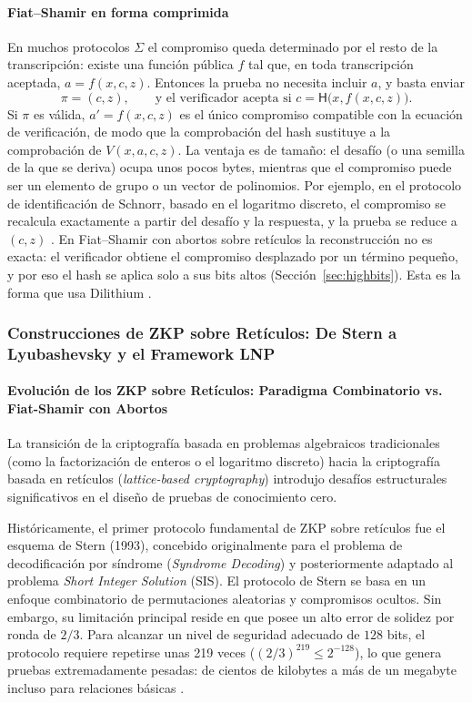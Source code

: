 \paragraph{Fiat--Shamir en forma comprimida}
\label{sec:fs-comprimido}
En muchos protocolos $\Sigma$ el compromiso queda determinado por el resto de la transcripción: existe una función pública $f$ tal que, en toda transcripción aceptada, $a = f(x, c, z)$. Entonces la prueba no necesita incluir $a$, y basta enviar
\begin{equation}
\pi = (c, z), \qquad \text{y el verificador acepta si } c = \mathsf{H}\big(x, f(x, c, z)\big).
\end{equation}
Si $\pi$ es válida, $a' = f(x, c, z)$ es el único compromiso compatible con la ecuación de verificación, de modo que la comprobación del hash sustituye a la comprobación de $V(x, a, c, z)$. La ventaja es de tamaño: el desafío (o una semilla de la que se deriva) ocupa unos pocos bytes, mientras que el compromiso puede ser un elemento de grupo o un vector de polinomios. Por ejemplo, en el protocolo de identificación de Schnorr, basado en el logaritmo discreto, el compromiso se recalcula exactamente a partir del desafío y la respuesta, y la prueba se reduce a $(c, z)$ \cite{schnorr1991efficient}. En Fiat--Shamir con abortos sobre retículos la reconstrucción no es exacta: el verificador obtiene el compromiso desplazado por un término pequeño, y por eso el hash se aplica solo a sus bits altos (Sección~\ref{sec:highbits}). Esta es la forma que usa Dilithium \cite{ducas2018crystals}.

\subsubsection{Construcciones de ZKP sobre Retículos: De Stern a Lyubashevsky y el Framework LNP}

\paragraph{Evolución de los ZKP sobre Retículos: Paradigma Combinatorio vs. Fiat-Shamir con Abortos}
La transición de la criptografía basada en problemas algebraicos tradicionales (como la factorización de enteros o el logaritmo discreto) hacia la criptografía basada en retículos (\textit{lattice-based cryptography}) introdujo desafíos estructurales significativos en el diseño de pruebas de conocimiento cero.

Históricamente, el primer protocolo fundamental de ZKP sobre retículos fue el esquema de Stern (1993), concebido originalmente para el problema de decodificación por síndrome (\textit{Syndrome Decoding}) y posteriormente adaptado al problema \textit{Short Integer Solution} (SIS). El protocolo de Stern se basa en un enfoque combinatorio de permutaciones aleatorias y compromisos ocultos. Sin embargo, su limitación principal reside en que posee un alto error de solidez por ronda de $2/3$. Para alcanzar un nivel de seguridad adecuado de $128$ bits, el protocolo requiere repetirse unas 219 veces ($(2/3)^{219} \le 2^{-128}$), lo que genera pruebas extremadamente pesadas: de cientos de kilobytes a más de un megabyte incluso para relaciones básicas \cite{badiezadegan2026complexity, cayrel2012improved, lyubashevsky2022lattice}.

